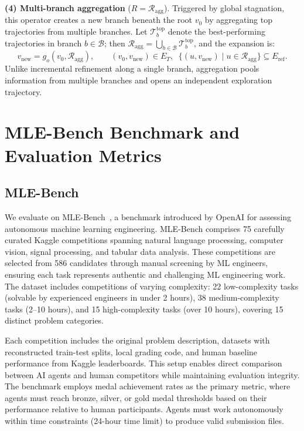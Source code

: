 \textbf{(4) Multi-branch aggregation} ($R = \mathcal{R}_{\text{agg}}$).
Triggered by global stagnation, this operator creates a new branch beneath the root $v_0$ by aggregating top trajectories from multiple branches. Let $\mathcal{T}^{\text{top}}_{b}$ denote the best-performing trajectories in branch $b \in \mathcal{B}$; then $\mathcal{R}_{\text{agg}} = \bigcup_{b \in \mathcal{B}} \mathcal{T}^{\text{top}}_{b}$, and the expansion is:
\begin{equation}
v_{\text{new}} = g_{o}(v_{0}, \mathcal{R}_{\text{agg}}), \qquad (v_{0}, v_{\text{new}}) \in E_{T}, \;\; \{(u, v_{\text{new}}) \mid u \in \mathcal{R}_{\text{agg}}\} \subseteq E_{\text{ref}}.
\end{equation}
Unlike incremental refinement along a single branch, aggregation pools information from multiple branches and opens an independent exploration trajectory.


\section{MLE-Bench Benchmark and Evaluation Metrics}
\label{appen:benchmark}

\subsection{MLE-Bench}
We evaluate \sname on MLE-Bench~\citep{mle-bench}, a benchmark introduced by OpenAI for assessing autonomous machine learning engineering. MLE-Bench comprises 75 carefully curated Kaggle competitions spanning natural language processing, computer vision, signal processing, and tabular data analysis. These competitions are selected from 586 candidates through manual screening by ML engineers, ensuring each task represents authentic and challenging ML engineering work. The dataset includes competitions of varying complexity: 22 low-complexity tasks (solvable by experienced engineers in under 2 hours), 38 medium-complexity tasks (2--10 hours), and 15 high-complexity tasks (over 10 hours), covering 15 distinct problem categories.

Each competition includes the original problem description, datasets with reconstructed train-test splits, local grading code, and human baseline performance from Kaggle leaderboards. This setup enables direct comparison between AI agents and human competitors while maintaining evaluation integrity. The benchmark employs medal achievement rates as the primary metric, where agents must reach bronze, silver, or gold medal thresholds based on their performance relative to human participants. Agents must work autonomously within time constraints (24-hour time limit) to produce valid submission files.

